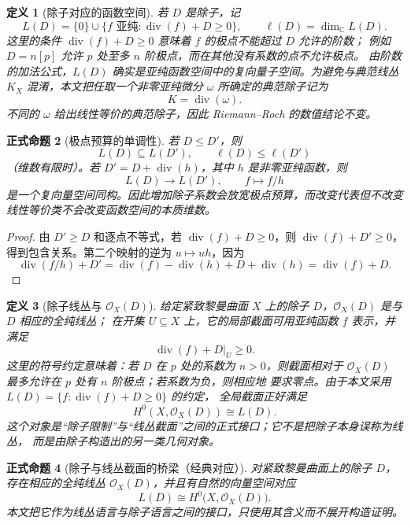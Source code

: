 \documentclass[UTF8,fontset=none,a4paper,11pt]{ctexart}
\theoremstyle{foundation-definition}
\newtheorem{definition}{定义}[section]
\theoremstyle{foundation-theorem}
\theoremstyle{foundation-proposition}
\newtheorem{proposition}[definition]{正式命题}
\theoremstyle{foundation-example}
\theoremstyle{foundation-remark}
\theoremstyle{foundation-theorem}
\newcommand{\C}{\mathbb C}
\begin{document}
\begin{definition}[除子对应的函数空间]\label{def:divisor-space}
若 \(D\) 是除子，记
\[
L(D)=\{0\}\cup\{f\text{ 亚纯}: \operatorname{div}(f)+D\geq0\},
\qquad
\ell(D)=\dim_{\C}L(D).
\]
这里的条件 \(\operatorname{div}(f)+D\geq0\) 意味着 \(f\) 的极点不能超过 \(D\) 允许的阶数；
例如 \(D=n[p]\) 允许 \(p\) 处至多 \(n\) 阶极点，而在其他没有系数的点不允许极点。
由阶数的加法公式，\(L(D)\) 确实是亚纯函数空间中的复向量子空间。为避免与典范线丛
\(K_X\) 混淆，本文把任取一个非零亚纯微分 \(\omega\) 所确定的典范除子记为
\[
K=\operatorname{div}(\omega).
\]
不同的 \(\omega\) 给出线性等价的典范除子，因此 Riemann--Roch 的数值结论不变。
\end{definition}

\begin{proposition}[极点预算的单调性]
若 \(D\leq D'\)，则
\[
L(D)\subseteq L(D'),\qquad \ell(D)\leq\ell(D')
\]
（维数有限时）。若 \(D'=D+\operatorname{div}(h)\)，其中 \(h\) 是非零亚纯函数，则
\[
L(D)\longrightarrow L(D'),\qquad f\longmapsto f/h
\]
是一个复向量空间同构。因此增加除子系数会放宽极点预算，而改变代表但不改变
线性等价类不会改变函数空间的本质维数。
\end{proposition}

\begin{proof}
由 \(D'\geq D\) 和逐点不等式，若 \(\operatorname{div}(f)+D\geq0\)，则
\(\operatorname{div}(f)+D'\geq0\)，得到包含关系。第二个映射的逆为
\(u\mapsto uh\)，因为
\[
\operatorname{div}(f/h)+D'
=\operatorname{div}(f)-\operatorname{div}(h)+D+\operatorname{div}(h)
=\operatorname{div}(f)+D.
\]
\end{proof}

\begin{definition}[除子线丛与 \(\mathcal O_X(D)\)]\label{def:divisor-line-bundle}
给定紧致黎曼曲面 \(X\) 上的除子 \(D\)，\(\mathcal O_X(D)\) 是与 \(D\) 相应的全纯线丛；
在开集 \(U\subseteq X\) 上，它的局部截面可用亚纯函数 \(f\) 表示，并满足
\[
\operatorname{div}(f)+D|_U\geq0.
\]
这里的符号约定意味着：若 \(D\) 在 \(p\) 处的系数为 \(n>0\)，则截面相对于
\(\mathcal O_X(D)\) 最多允许在 \(p\) 处有 \(n\) 阶极点；若系数为负，则相应地
要求零点。由于本文采用 \(L(D)=\{f:\operatorname{div}(f)+D\geq0\}\) 的约定，
全局截面正好满足
\[
H^0(X,\mathcal O_X(D))
\cong L(D).
\]
这个对象是“除子限制”与“线丛截面”之间的正式接口；它不是把除子本身误称为线丛，
而是由除子构造出的另一类几何对象。
\end{definition}

\begin{proposition}[除子与线丛截面的桥梁（经典对应）]
对紧致黎曼曲面上的除子 \(D\)，存在相应的全纯线丛
\(\mathcal O_X(D)\)，并且有自然的向量空间对应
\[
L(D)\cong H^0\bigl(X,\mathcal O_X(D)\bigr).
\]
本文把它作为线丛语言与除子语言之间的接口，只使用其含义而不展开构造证明。
\end{proposition}
\end{document}
